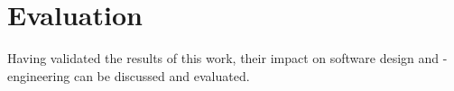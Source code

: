%
%
%
%
%
%
%

\section{Evaluation}
\label{evaluation_heading}

Having validated the results of this work, their impact on software design and
-engineering can be discussed and evaluated.


%


